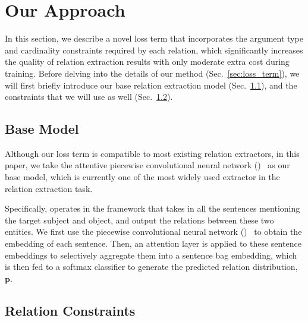 \section{Our Approach}
In this section, we describe a novel loss term that incorporates the argument type and cardinality constraints required by each relation,
which significantly increases the quality of relation extraction results with only moderate extra cost during training.
Before delving into the details of our method (Sec.~\ref{sec:loss_term}), we will first briefly introduce our base relation extraction model (Sec.~\ref{sec:base_model}), and the constraints that we will use as well (Sec.~\ref{sec:constraints}).





\subsection{Base Model}
\label{sec:base_model}
Although our loss term is compatible to most existing relation extractors, in this paper, we take the attentive piecewise convolutional neural network (\APCNN)~\cite{lin2016neural} as our base model, which is currently one of the most widely used extractor in the relation extraction task.

Specifically, \APCNN operates in the \MIL framework that takes in all the sentences mentioning the target subject and object, and output the relations between these two entities.
We first use the piecewise convolutional neural network (\PCNN)~\cite{zeng2015distant} to obtain the embedding of each sentence.
Then, an attention layer is applied to these sentence embeddings to selectively aggregate them into a sentence bag embedding, which is then fed to a softmax classifier to generate the predicted relation distribution, $\bm{p}$.



\subsection{Relation Constraints}
\label{sec:constraints}

